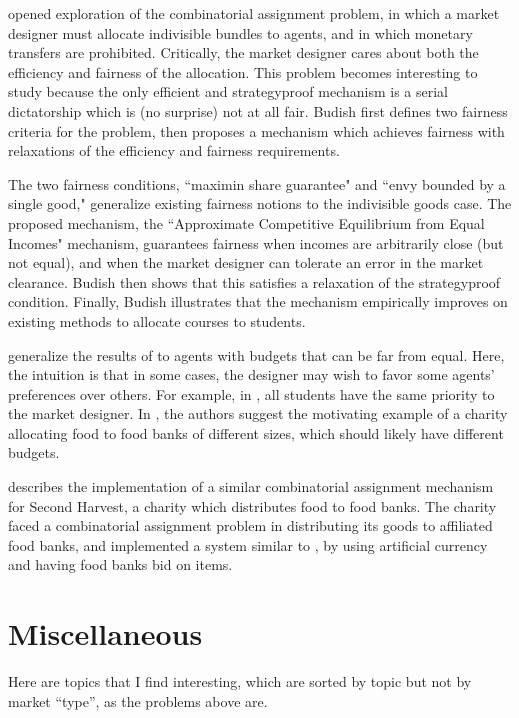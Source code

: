 \documentclass[JEL]{AEA}
\begin{document}
\cite{budish-2011} opened exploration of the combinatorial assignment problem, in which a market designer must allocate indivisible bundles to agents, and in which monetary transfers are prohibited. Critically, the market designer cares about both the efficiency and fairness of the allocation. This problem becomes interesting to study because the only efficient and strategyproof mechanism is a serial dictatorship which is (no surprise) not at all fair. Budish first defines two fairness criteria for the problem, then proposes a mechanism which achieves fairness with relaxations of the efficiency and fairness requirements.

The two fairness conditions, ``maximin share guarantee" and ``envy bounded by a single good," generalize existing fairness notions to the indivisible goods case. The proposed mechanism, the ``Approximate Competitive Equilibrium from Equal Incomes" mechanism, guarantees fairness when incomes are arbitrarily close (but not equal), and when the market designer can tolerate an error in the market clearance. Budish then shows that this satisfies a relaxation of the strategyproof condition. Finally, Budish illustrates that the mechanism empirically improves on existing methods to allocate courses to students.

\cite{babaioff-2019} generalize the results of \cite{budish-2011} to agents with budgets that can be far from equal. Here, the intuition is that in some cases, the designer may wish to favor some agents' preferences over others. For example, in \cite{budish-2011}, all students have the same priority to the market designer. In \cite{babaioff-2019}, the authors suggest the motivating example of a charity allocating food to food banks of different sizes, which should likely have different budgets.

\cite{prendergast-2017} describes the implementation of a similar combinatorial assignment mechanism for Second Harvest, a charity which distributes food to food banks. The charity faced a combinatorial assignment problem in distributing its goods to affiliated food banks, and implemented a system similar to \cite{budish-2011}, by using artificial currency and having food banks bid on items.

\section{Miscellaneous}

Here are topics that I find interesting, which are sorted by topic but not by market ``type'', as the problems above are.
\end{document}
